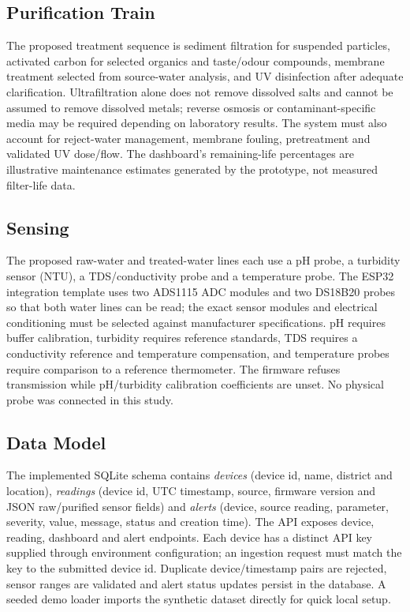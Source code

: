 \documentclass[10pt,letterpaper,twocolumn]{article}
\begin{document}
\subsection{Purification Train}
The proposed treatment sequence is sediment filtration for suspended particles, activated carbon for selected organics and taste/odour compounds, membrane treatment selected from source-water analysis, and UV disinfection after adequate clarification. Ultrafiltration alone does not remove dissolved salts and cannot be assumed to remove dissolved metals; reverse osmosis or contaminant-specific media may be required depending on laboratory results. The system must also account for reject-water management, membrane fouling, pretreatment and validated UV dose/flow. The dashboard's remaining-life percentages are illustrative maintenance estimates generated by the prototype, not measured filter-life data.

\subsection{Sensing}
The proposed raw-water and treated-water lines each use a pH probe, a turbidity sensor (NTU), a TDS/conductivity probe and a temperature probe. The ESP32 integration template uses two ADS1115 ADC modules and two DS18B20 probes so that both water lines can be read; the exact sensor modules and electrical conditioning must be selected against manufacturer specifications. pH requires buffer calibration, turbidity requires reference standards, TDS requires a conductivity reference and temperature compensation, and temperature probes require comparison to a reference thermometer. The firmware refuses transmission while pH/turbidity calibration coefficients are unset. No physical probe was connected in this study.

\subsection{Data Model}
The implemented SQLite schema contains \emph{devices} (device id, name, district and location), \emph{readings} (device id, UTC timestamp, source, firmware version and JSON raw/purified sensor fields) and \emph{alerts} (device, source reading, parameter, severity, value, message, status and creation time). The API exposes device, reading, dashboard and alert endpoints. Each device has a distinct API key supplied through environment configuration; an ingestion request must match the key to the submitted device id. Duplicate device/timestamp pairs are rejected, sensor ranges are validated and alert status updates persist in the database. A seeded demo loader imports the synthetic dataset directly for quick local setup.
\end{document}
